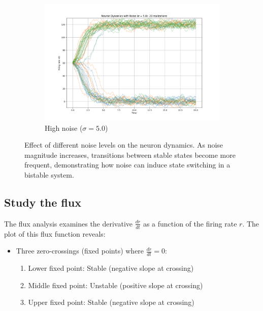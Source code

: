 \documentclass{article}
\begin{document}
\begin{figure}[H]
    \vspace{0.3cm}
    \begin{subfigure}[b]{0.48\textwidth}
        \includegraphics[width=\textwidth]{noise_strength_5.0.png}
        \caption{High noise ($\sigma = 5.0$)}
        \label{fig:noise_high}
    \end{subfigure}
    \caption{Effect of different noise levels on the neuron dynamics. As noise magnitude increases, transitions between stable states become more frequent, demonstrating how noise can induce state switching in a bistable system.}
    \label{fig:noise_effects}
\end{figure}


\subsection{Study the flux}


The flux analysis examines the derivative $\frac{dr}{dt}$ as a function of the firing rate $r$. The plot of this flux function reveals:

\begin{itemize}
    \item Three zero-crossings (fixed points) where $\frac{dr}{dt} = 0$:
    \begin{enumerate}
        \item Lower fixed point: Stable (negative slope at crossing)
        \item Middle fixed point: Unstable (positive slope at crossing)
        \item Upper fixed point: Stable (negative slope at crossing)
    \end{enumerate}
\end{itemize}
\end{document}
